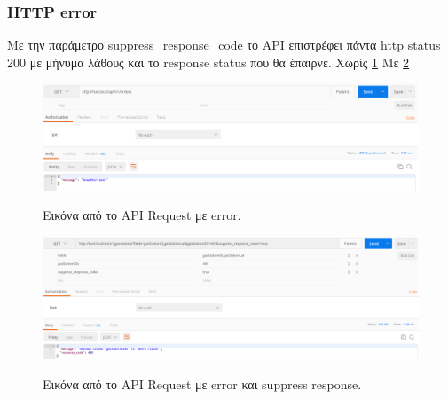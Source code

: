 \subsubsection{HTTP error}
Με την παράμετρο suppress\_response\_code το API επιστρέφει πάντα http status 200 με μήνυμα λάθους και το response status που θα έπαιρνε. Χωρίς \ref{fig:error} Με \ref{fig:suppress}

\begin{figure}[H]
  \caption{Εικόνα από το API Request με error.}
  \centering
    \includegraphics[width=1\textwidth]{img/error.png}
    \label{fig:error}
\end{figure}

\begin{figure}[H]
  \caption{Εικόνα από το API Request με error και suppress response.}
  \centering
    \includegraphics[width=1\textwidth]{img/suppress.png}
    \label{fig:suppress}
\end{figure}